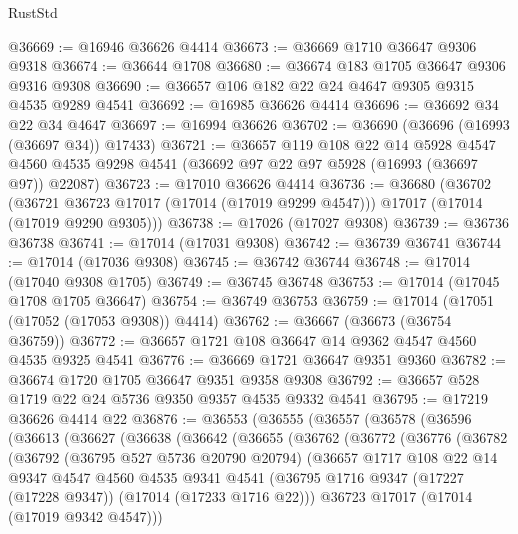 \begin{lexlean}{RustStd}
\begin{coremodule}
{\begin{coremodule}
{{{{{{{{{{{{{{{{{{{{{{{{{{{{{{{{{{{{{{{{{{{{{{{{{{{{{{{@36669 := @16946 @36626 @4414
@36673 := @36669 @1710 @36647 @9306 @9318
@36674 := @36644 @1708
@36680 := @36674 @183 @1705 @36647 @9306 @9316 @9308
@36690 := @36657 @106 @182 @22 @24 @4647 @9305 @9315 @4535 @9289 @4541
@36692 := @16985 @36626 @4414
@36696 := @36692 @34 @22 @34 @4647
@36697 := @16994 @36626
@36702 := @36690 (@36696 (@16993 (@36697 @34)) @17433)
@36721 := @36657
    @119
    @108
    @22
    @14
    @5928
    @4547
    @4560
    @4535
    @9298
    @4541
    (@36692 @97 @22 @97 @5928 (@16993 (@36697 @97)) @22087)
@36723 := @17010 @36626 @4414
@36736 := @36680
    (@36702
      (@36721 @36723 @17017 (@17014 (@17019 @9299 @4547)))
      @17017
      (@17014 (@17019 @9290 @9305)))
@36738 := @17026 (@17027 @9308)
@36739 := @36736 @36738
@36741 := @17014 (@17031 @9308)
@36742 := @36739 @36741
@36744 := @17014 (@17036 @9308)
@36745 := @36742 @36744
@36748 := @17014 (@17040 @9308 @1705)
@36749 := @36745 @36748
@36753 := @17014 (@17045 @1708 @1705 @36647)
@36754 := @36749 @36753
@36759 := @17014 (@17051 (@17052 (@17053 @9308)) @4414)
@36762 := @36667 (@36673 (@36754 @36759))
@36772 := @36657 @1721 @108 @36647 @14 @9362 @4547 @4560 @4535 @9325 @4541
@36776 := @36669 @1721 @36647 @9351 @9360
@36782 := @36674 @1720 @1705 @36647 @9351 @9358 @9308
@36792 := @36657 @528 @1719 @22 @24 @5736 @9350 @9357 @4535 @9332 @4541
@36795 := @17219 @36626 @4414 @22
@36876 := @36553
    (@36555
      (@36557
        (@36578
          (@36596
            (@36613
              (@36627
                (@36638
                  (@36642
                    (@36655
                      (@36762
                        (@36772
                          (@36776
                            (@36782
                              (@36792
                                (@36795 @527 @5736 @20790 @20794)
                                (@36657
                                  @1717
                                  @108
                                  @22
                                  @14
                                  @9347
                                  @4547
                                  @4560
                                  @4535
                                  @9341
                                  @4541
                                  (@36795
                                    @1716
                                    @9347
                                    (@17227 (@17228 @9347))
                                    (@17014 (@17233 @1716 @22)))
                                  @36723
                                  @17017
                                  (@17014 (@17019 @9342 @4547)))
}}}}}}}}}}}}}}}}}}}}}}}}}}}}}}}}}}}}}}}}}}}}}}}}}}}}}}}
\end{coremodule}}
\end{coremodule}
\end{lexlean}
